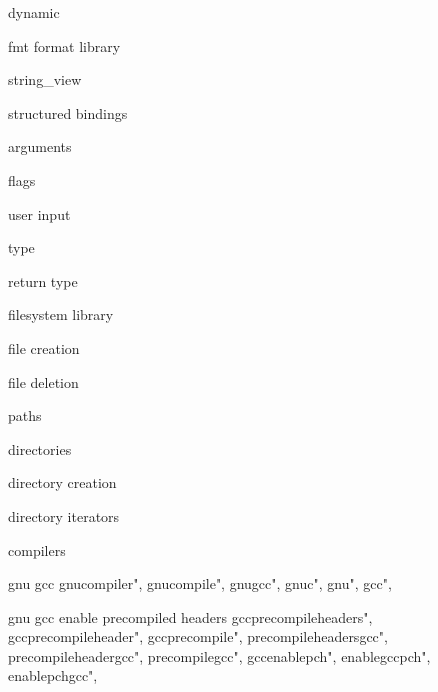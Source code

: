          dynamic 
        
         fmt format library
          
         string_view
        
         structured bindings
        
         arguments 
        
         flags 
        
         user input 
        
         type 
        
         return type 
        
         filesystem library
         
         file creation 
        
         file deletion 
        
         paths 
        
         directories

         directory creation
        
         directory iterators 
        
         compilers 
        
         gnu gcc
        gnucompiler",
        gnucompile",
        gnugcc",
        gnuc",
        gnu",
        gcc",
        
         gnu gcc enable precompiled headers
        gccprecompileheaders",  
        gccprecompileheader",  
        gccprecompile",  
        precompileheadersgcc",  
        precompileheadergcc",  
        precompilegcc",  
        gccenablepch",  
        enablegccpch",  
        enablepchgcc",  
        
